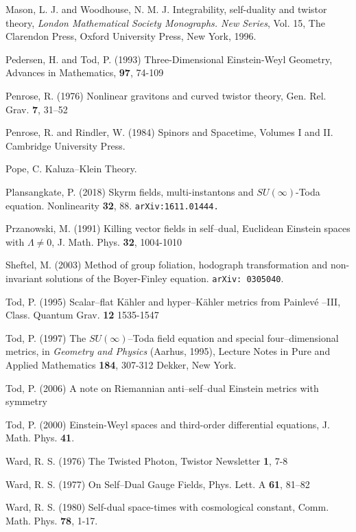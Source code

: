 \begin{thebibliography}{}
 Mason, L. J. and Woodhouse, N. M. J.  Integrability, self-duality and twistor theory, {\em London Mathematical Society Monographs. New Series}, Vol. 15, The Clarendon Press, Oxford University Press, New York, 1996.


 Pedersen, H. and Tod, P. (1993)
Three-Dimensional Einstein-Weyl Geometry,
Advances in Mathematics, {\bf 97}, 74-109


 Penrose, R. (1976) Nonlinear 
gravitons and curved twistor theory, Gen. Rel. Grav.  {\bf 7},  31--52

 Penrose, R. and Rindler, W. (1984)
Spinors and Spacetime, Volumes I and II. Cambridge University Press.

 Pope, C. Kaluza--Klein Theory.

 Plansangkate, P. (2018)
Skyrm fields, multi-instantons and $SU(\infty)$-Toda equation.
Nonlinearity {\bf 32}, 88.
{\tt arXiv:1611.01444.}

 Przanowski, M. (1991)
Killing vector fields in self--dual, Euclidean Einstein spaces with $\Lambda\neq 0$,
J. Math. Phys. {\bf 32}, 1004-1010

 Sheftel, M. (2003)
Method of group foliation, hodograph transformation and non-invariant solutions of the Boyer-Finley equation.
{\tt arXiv: 0305040}.

 Tod, P. (1995)
Scalar--flat K\"ahler and hyper--K\"ahler metrics from Painlev\'e --III,
Class. Quantum Grav. {\bf 12} 1535-1547

 Tod, P. (1997)
The $SU(\infty)$--Toda field equation and special four--dimensional metrics,
in {\em Geometry and Physics} (Aarhus, 1995), Lecture Notes in Pure and Applied Mathematics {\bf 184}, 307-312 Dekker, New York.

 Tod, P. (2006) {A note on Riemannian anti--self--dual Einstein metrics with symmetry}

 Tod, P. (2000) {Einstein-Weyl spaces and third-order differential equations}, J. Math. Phys. {\bf 41}.



 Ward, R. S. (1976)
The Twisted Photon,
Twistor Newsletter {\bf 1}, 7-8

 Ward, R. S. (1977)
On Self--Dual Gauge Fields,
Phys. Lett. A {\bf 61}, 81--82

   Ward, R. S. (1980)
Self-dual space-times with cosmological constant,
Comm. Math. Phys. {\bf 78},  1-17.


\end{thebibliography}
